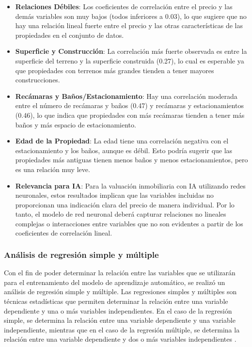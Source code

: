 \begin{itemize}
  \item \textbf{Relaciones Débiles}: Los coeficientes de correlación entre el precio y las demás
variables son muy bajos (todos inferiores a 0.03), lo que sugiere que no hay una
relación lineal fuerte entre el precio y las otras características de las
propiedades en el conjunto de datos.
\item \textbf{Superficie y Construcción}: La correlación más fuerte observada es entre la superficie
del terreno y la superficie construida (0.27), lo cual es esperable ya que propiedades
con terrenos más grandes tienden a tener mayores construcciones.
\item \textbf{Recámaras y Baños/Estacionamiento}: Hay una correlación moderada entre el número
de recámaras y baños (0.47) y recámaras y estacionamientos (0.46), lo que indica
que propiedades con más recámaras tienden a tener más baños y más espacio de
estacionamiento.
\item \textbf{Edad de la Propiedad}: La edad tiene una correlación negativa con el estacionamiento
y los baños, aunque es débil. Esto podría sugerir que las propiedades más antiguas
tienen menos baños y menos estacionamientos, pero es una relación muy leve.
\item \textbf{Relevancia para IA}: Para la valuación inmobiliaria con IA utilizando redes
neuronales, estos resultados implican que las variables incluidas no proporcionan
una indicación clara del precio de manera individual. Por lo tanto, el modelo
de red neuronal deberá capturar relaciones no lineales complejas o interacciones
entre variables que no son evidentes a partir de los coeficientes de correlación
lineal.
\end{itemize}

\subsubsection{Análisis de regresión simple y múltiple}

Con el fin de poder determinar la relación entre las variables que se utilizarán
para el entrenamiento del modelo de aprendizaje automático, se realizó un análisis
de regresión simple y múltiple. Las regresiones simples y múltiples son técnicas
estadísticas que permiten determinar la relación entre una variable dependiente
y una o más variables independientes. En el caso de la regresión simple, se
determina la relación entre una variable dependiente y una variable independiente,
mientras que en el caso de la regresión múltiple, se determina la relación entre
una variable dependiente y dos o más variables independientes \cite{stock2012introduccion}.

